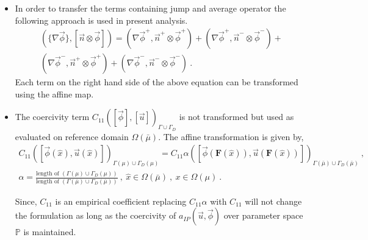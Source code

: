 \documentclass[graybox]{svmult}
\begin{document}
\begin{itemize}
\item In order to transfer the terms containing jump and average operator the following approach is used in present analysis.
\begin{equation*}\label{jump_average_term_split}
\begin{split}
\left(\lbrace \nabla \overrightarrow{\phi} \rbrace , \left[ \overrightarrow{n} \otimes \overrightarrow{\phi}  \right]  \right) = \left( \nabla \overrightarrow{\phi}^+ , \overrightarrow{n}^+ \otimes \overrightarrow{\phi}^+ \right) + \left( \nabla \overrightarrow{\phi}^+ , \overrightarrow{n}^- \otimes \overrightarrow{\phi}^- \right) + \\ 
\left( \nabla \overrightarrow{\phi}^- , \overrightarrow{n}^+ \otimes \overrightarrow{\phi}^+ \right) + \left( \nabla \overrightarrow{\phi}^- , \overrightarrow{n}^- \otimes \overrightarrow{\phi}^- \right) \ .
\end{split}
\end{equation*}
Each term on the right hand side of the above equation can be transformed using the affine map.

\item The coercivity term $C_{11}\left( [\overrightarrow{\phi}],[\overrightarrow{u}] \right)_{\Gamma \cup \Gamma_D}$ is not transformed but used as evaluated on reference domain $\Omega(\bar{\mu})$. The affine transformation is given by,
\begin{equation*}
\begin{split}
C_{11}\left( [\overrightarrow{\phi}(\hat{x}),\overrightarrow{u}(\hat{x})] \right)_{\Gamma(\mu) \cup \Gamma_D(\mu)} = C_{11} \alpha \left( [\overrightarrow{\phi}(\bm{F}(\hat{x})),\overrightarrow{u}(\bm{F}(\hat{x}))] \right)_{\Gamma(\bar{\mu}) \cup \Gamma_D(\bar{\mu})} \ , \\
\alpha = \frac{\text{length of }\left( \Gamma(\mu) \cup \Gamma_D(\mu)\right)}{\text{length of }\left( \Gamma(\bar{\mu}) \cup \Gamma_D(\bar{\mu})\right)} \ , \ \hat{x} \in \Omega(\bar{\mu}) \ , \ x \in \Omega(\mu) \ .
\end{split}
\end{equation*}

Since, $C_{11}$ is an empirical coefficient replacing $C_{11} \alpha$ with $C_{11}$ will not change the formulation as long as the coercivity of $a_{IP}(\overrightarrow{u},\overrightarrow{\phi}) $ over parameter space $\mathbb{P}$ is maintained. 
\end{itemize}
\end{document}

